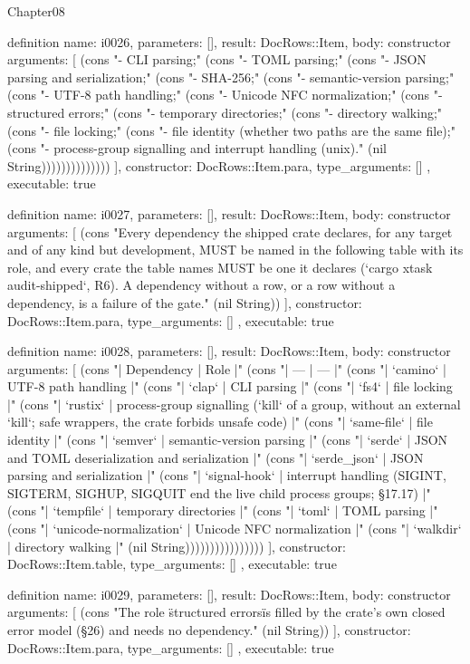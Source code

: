 \begin{lexlean}{Chapter08}
\begin{semanticmodule}
definition{
  name: i0026,
  parameters: [],
  result: DocRows::Item,
  body: constructor{
    arguments: [
      (cons "- CLI parsing;" (cons "- TOML parsing;" (cons "- JSON parsing and serialization;" (cons "- SHA-256;" (cons "- semantic-version parsing;" (cons "- UTF-8 path handling;" (cons "- Unicode NFC normalization;" (cons "- structured errors;" (cons "- temporary directories;" (cons "- directory walking;" (cons "- file locking;" (cons "- file identity (whether two paths are the same file);" (cons "- process-group signalling and interrupt handling (unix)." (nil String))))))))))))))
    ],
    constructor: DocRows::Item.para,
    type_arguments: []
  },
  executable: true
}

definition{
  name: i0027,
  parameters: [],
  result: DocRows::Item,
  body: constructor{
    arguments: [
      (cons "Every dependency the shipped crate declares, for any target and of any kind but development, MUST be named in the following table with its role, and every crate the table names MUST be one it declares (`cargo xtask audit-shipped`, R6). A dependency without a row, or a row without a dependency, is a failure of the gate." (nil String))
    ],
    constructor: DocRows::Item.para,
    type_arguments: []
  },
  executable: true
}

definition{
  name: i0028,
  parameters: [],
  result: DocRows::Item,
  body: constructor{
    arguments: [
      (cons "| Dependency | Role |" (cons "| --- | --- |" (cons "| `camino` | UTF-8 path handling |" (cons "| `clap` | CLI parsing |" (cons "| `fs4` | file locking |" (cons "| `rustix` | process-group signalling (`kill` of a group, without an external `kill`; safe wrappers, the crate forbids unsafe code) |" (cons "| `same-file` | file identity |" (cons "| `semver` | semantic-version parsing |" (cons "| `serde` | JSON and TOML deserialization and serialization |" (cons "| `serde_json` | JSON parsing and serialization |" (cons "| `signal-hook` | interrupt handling (SIGINT, SIGTERM, SIGHUP, SIGQUIT end the live child process groups; §17.17) |" (cons "| `tempfile` | temporary directories |" (cons "| `toml` | TOML parsing |" (cons "| `unicode-normalization` | Unicode NFC normalization |" (cons "| `walkdir` | directory walking |" (nil String))))))))))))))))
    ],
    constructor: DocRows::Item.table,
    type_arguments: []
  },
  executable: true
}

definition{
  name: i0029,
  parameters: [],
  result: DocRows::Item,
  body: constructor{
    arguments: [
      (cons "The role \"structured errors\" is filled by the crate's own closed error model (§26) and needs no dependency." (nil String))
    ],
    constructor: DocRows::Item.para,
    type_arguments: []
  },
  executable: true
}


\end{semanticmodule}
\end{lexlean}
